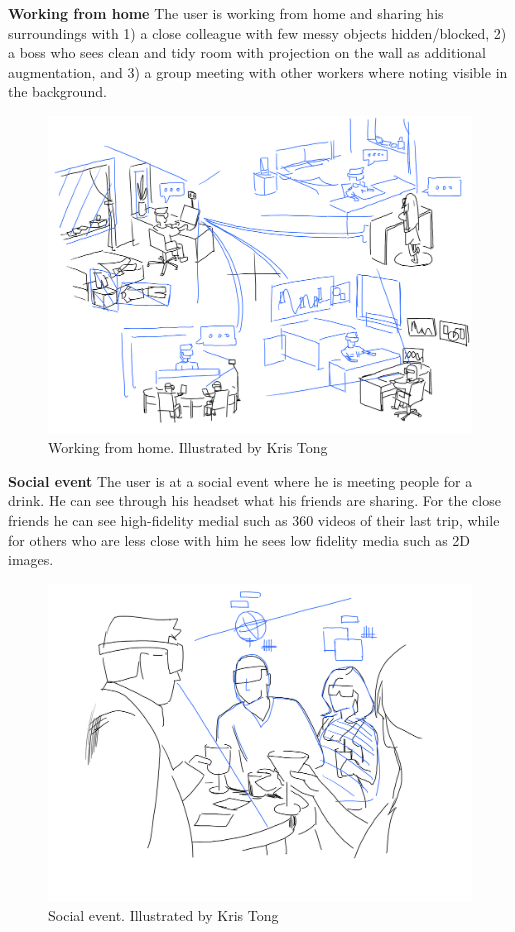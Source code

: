 \textbf{Working from home}
The user is working from home and sharing his surroundings with 1) a close colleague with few messy objects hidden/blocked, 2) a boss who sees clean and tidy room with projection on the wall as additional augmentation, and 3) a group meeting with other workers where noting visible in the background. 

\begin{figure}[H]
    \centering
    \includegraphics[width=.8\linewidth]{images/illustrations/2_Group_Meeting.png}
    \caption{Working from home. Illustrated by Kris Tong}
    \label{fig:illustration:group-meeting}
\end{figure}


\textbf{Social event}
The user is at a social event where he is meeting people for a drink. He can see through his headset what his friends are sharing. For the close friends he can see high-fidelity medial such as 360 videos of their last trip, while for others who are less close with him he sees low fidelity media such as 2D images. 

\begin{figure}[H]
    \centering
    \includegraphics[width=.8\linewidth]{images/illustrations/3_Bar_Scene.png}
    \caption{Social event. Illustrated by Kris Tong}
    \label{fig:illustration:social-event}
\end{figure}


